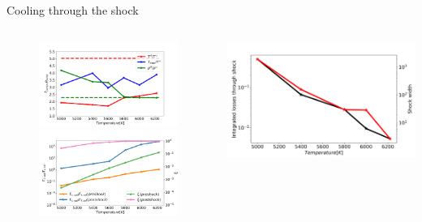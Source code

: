 \documentclass[10pt,aspectratio=169,usenames,dvipsnames]{beamer}
\begin{document}
\begin{frame}{Cooling through the shock}
\begin{columns}
\begin{column}{0.5\textwidth}
\begin{figure}
    \centering
    \includegraphics[width=0.95\linewidth,clip=true,trim=1.2cm 0.3cm 1.6cm 1.8cm]{2023ECRW/Figures/tcompcor_plot.png} \\
    \includegraphics[width=0.95\linewidth,clip=true,trim=0.4cm 0.3cm 0.1cm 1.8cm]{2023ECRW/Figures/tcompcor_ion_plot.png}
\end{figure}
\end{column}
\begin{column}{0.42\textwidth}
\includegraphics[width=0.95\linewidth,clip=true,trim=0.2cm 0.3cm 0.0cm 1.6cm]{2023ECRW/Figures/tcomploss_plot.png}

\end{column}
\end{columns}
\end{frame}
\end{document}
